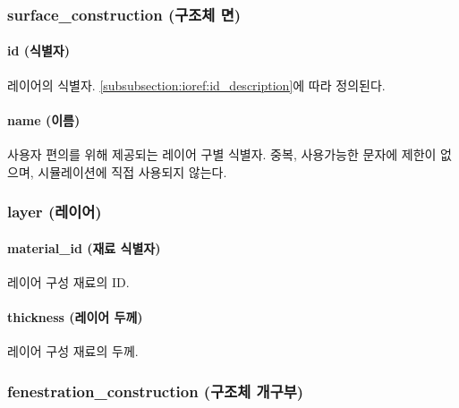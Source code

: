 \subsubsection{surface\_construction (구조체 면)} \label{subsubsection:ioref:construction}

 
\paragraph{id (식별자)} 레이어의 식별자. \ref{subsubsection:ioref:id_description}에 따라 정의된다.

\paragraph{name (이름)} 사용자 편의를 위해 제공되는 레이어 구별 식별자. 중복, 사용가능한 문자에 제한이 없으며, 시뮬레이션에 직접 사용되지 않는다.

\subsubsection{layer (레이어)} \label{subsubsection:ioref:layer}


\paragraph{material\_id (재료 식별자)} 레이어 구성 재료의 ID.

\paragraph{thickness (레이어 두께)} 레이어 구성 재료의 두께.

\subsubsection{fenestration\_construction (구조체 개구부)} \label{subsubsection:ioref:fenestrationconstruction}

